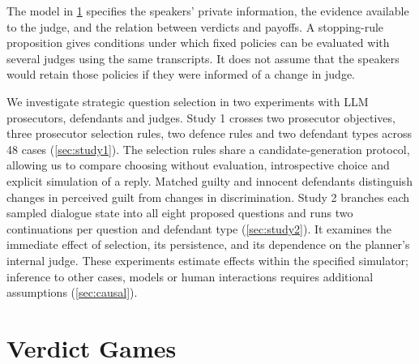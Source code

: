 \documentclass[10pt,a4paper]{article}
\theoremstyle{remark}
\begin{document}
The model in \cref{sec:verdict} specifies the speakers' private information, the evidence available to the judge,
and the relation between verdicts and payoffs. A stopping-rule proposition gives conditions under which fixed
policies can be evaluated with several judges using the same transcripts. It does not assume that the speakers would
retain those policies if they were informed of a change in judge.

We investigate strategic question selection in two experiments with LLM prosecutors, defendants and judges.
Study 1 crosses two prosecutor objectives, three prosecutor selection rules, two defence rules and two defendant
types across 48 cases (\cref{sec:study1}). The selection rules share a candidate-generation protocol, allowing us
to compare choosing without evaluation, introspective choice and explicit simulation of a reply. Matched guilty and
innocent defendants distinguish changes in perceived guilt from changes in discrimination. Study 2 branches each
sampled dialogue state into all eight proposed questions and runs two continuations per question and defendant type
(\cref{sec:study2}). It examines the immediate effect of selection, its persistence, and its dependence on the
planner's internal judge. These experiments estimate effects within the specified simulator; inference to other
cases, models or human interactions requires additional assumptions (\cref{sec:causal}).

\section{Verdict Games}\label{sec:verdict}
\end{document}
